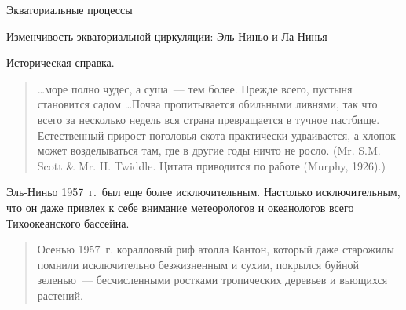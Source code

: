\begin{chapter}{Экваториальные процессы}
\begin{section}{Изменчивость экваториальной циркуляции: Эль-Ниньо и Ла-Нинья}
\begin{paragraph}{Историческая справка.}
\begin{quotation}
\ldots море полно чудес, а суша~--- тем более. Прежде всего, пустыня 
становится садом \ldots  Почва пропитывается обильными ливнями, так что всего
за несколько недель вся страна превращается в тучное пастбище. Естественный
прирост поголовья скота практически удваивается, а хлопок может возделываться
там, где в другие годы ничто не росло. 
(Mr. S.M. Scott \& Mr. H. Twiddle. Цитата приводится по работе (Murphy, 1926).)
%
\end{quotation}

Эль-Ниньо 1957~г.\ был еще более исключительным. Настолько исключительным,
что он даже привлек к себе внимание метеорологов и океанологов всего 
Тихоокеанского бассейна.
%
\begin{quotation}
Осенью 1957~г. коралловый риф атолла Кантон, который даже старожилы помнили
исключительно безжизненным и сухим, покрылся буйной зеленью~--- бесчисленными
ростками тропических деревьев и вьющихся растений.
%


\end{quotation}
\end{paragraph}
\end{section}
\end{chapter}
